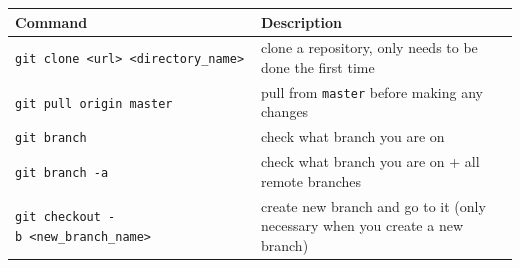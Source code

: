 \documentclass[]{book}
\begin{document}
\begin{longtable}[]{@{}ll@{}}
\toprule
\begin{minipage}[b]{0.13\columnwidth}\raggedright\strut
Command\strut
\end{minipage} & \begin{minipage}[b]{0.22\columnwidth}\raggedright\strut
Description\strut
\end{minipage}\tabularnewline
\midrule
\endhead
\begin{minipage}[t]{0.13\columnwidth}\raggedright\strut
\texttt{git\ clone\ \textless{}url\textgreater{}\ \textless{}directory\_name\textgreater{}}\strut
\end{minipage} & \begin{minipage}[t]{0.22\columnwidth}\raggedright\strut
clone a repository, only needs to be done the first time\strut
\end{minipage}\tabularnewline
\begin{minipage}[t]{0.13\columnwidth}\raggedright\strut
\texttt{git\ pull\ origin\ master}\strut
\end{minipage} & \begin{minipage}[t]{0.22\columnwidth}\raggedright\strut
pull from \texttt{master} before making any changes\strut
\end{minipage}\tabularnewline
\begin{minipage}[t]{0.13\columnwidth}\raggedright\strut
\texttt{git\ branch}\strut
\end{minipage} & \begin{minipage}[t]{0.22\columnwidth}\raggedright\strut
check what branch you are on\strut
\end{minipage}\tabularnewline
\begin{minipage}[t]{0.13\columnwidth}\raggedright\strut
\texttt{git\ branch\ -a}\strut
\end{minipage} & \begin{minipage}[t]{0.22\columnwidth}\raggedright\strut
check what branch you are on + all remote branches\strut
\end{minipage}\tabularnewline
\begin{minipage}[t]{0.13\columnwidth}\raggedright\strut
\texttt{git\ checkout\ -b\ \textless{}new\_branch\_name\textgreater{}}\strut
\end{minipage} & \begin{minipage}[t]{0.22\columnwidth}\raggedright\strut
create new branch and go to it (only necessary when you create a new
branch)\strut
\end{minipage}\tabularnewline

\end{longtable}
\end{document}
